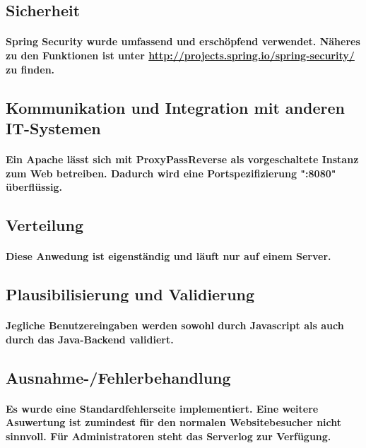 \documentclass[a4paper]{article}
\begin{document}
\subsection{Sicherheit}

\paragraph{Spring Security wurde umfassend und erschöpfend verwendet. Näheres zu den Funktionen ist unter \url{http://projects.spring.io/spring-security/} zu finden.}

\subsection{Kommunikation und Integration mit anderen IT-Systemen}

\paragraph{Ein Apache lässt sich mit ProxyPassReverse als vorgeschaltete Instanz zum Web betreiben. Dadurch wird eine Portspezifizierung ":8080" überflüssig.}

\subsection{Verteilung}

\paragraph{Diese Anwedung ist eigenständig und läuft nur auf einem Server.}

\subsection{Plausibilisierung und Validierung}

\paragraph{Jegliche Benutzereingaben werden sowohl durch Javascript als auch durch das Java-Backend validiert.}

\subsection{Ausnahme-/Fehlerbehandlung}

\paragraph{Es wurde eine Standardfehlerseite implementiert. Eine weitere Asuwertung ist zumindest für den normalen Websitebesucher nicht sinnvoll. Für Administratoren steht das Serverlog zur Verfügung.}
\end{document}
